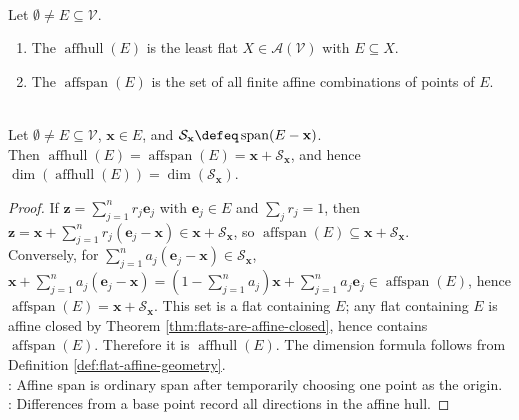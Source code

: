 \begin{definition} \label{def:affine-hull-and-affine-span} \\
Let $\emptyset\neq E\subseteq\mathcal{V}$.
\begin{enumerate}[label=(\roman*)]
\setlength{\itemsep}{0pt}
\item The  $\operatorname{affhull}(E)$ is the least flat $X\in\mathcal{A}(\mathcal{V})$ with $E\subseteq X$.
\item The  $\operatorname{affspan}(E)$ is the set of all finite affine combinations of points of $E$.
\end{enumerate}
\end{definition}

\begin{theorem} \label{thm:affine-hull-span-formula} \\
Let $\emptyset\neq E\subseteq\mathcal{V}$, $\mathbf{x}\in E$, and $\mathcal{S}_{\mathbf{x}}\defeq\operatorname{span}(E-\mathbf{x})$.\\
Then $\operatorname{affhull}(E)=\operatorname{affspan}(E) =\mathbf{x}+\mathcal{S}_{\mathbf{x}}$, and hence $\dim(\operatorname{affhull}(E)) =\dim(\mathcal{S}_{\mathbf{x}})$.
\begin{proof}
If $\mathbf{z}=\sum\limits_{j=1}^n r_j\mathbf{e}_j$ with $\mathbf{e}_j\in E$ and $\sum\limits_j r_j=1$, then $\mathbf{z} =\mathbf{x}+\sum\limits_{j=1}^n r_j(\mathbf{e}_j-\mathbf{x})\in\mathbf{x}+\mathcal{S}_{\mathbf{x}}$, so $\operatorname{affspan}(E)\subseteq\mathbf{x}+\mathcal{S}_{\mathbf{x}}$.\\
Conversely, for $\sum\limits_{j=1}^n a_j(\mathbf{e}_j-\mathbf{x})\in\mathcal{S}_{\mathbf{x}}$, $\mathbf{x}+\sum\limits_{j=1}^n a_j(\mathbf{e}_j-\mathbf{x}) =\left(1-\sum\limits_{j=1}^n a_j\right)\mathbf{x}+\sum_{j=1}^n a_j\mathbf{e}_j\in\operatorname{affspan}(E)$, hence $\operatorname{affspan}(E)=\mathbf{x}+\mathcal{S}_{\mathbf{x}}$. This set is a flat containing $E$; any flat containing $E$ is affine closed by Theorem \ref{thm:flats-are-affine-closed}, hence contains $\operatorname{affspan}(E)$. Therefore it is $\operatorname{affhull}(E)$. The dimension formula follows from Definition \ref{def:flat-affine-geometry}.\\
: Affine span is ordinary span after temporarily choosing one point as the origin.\\
: Differences from a base point record all directions in the affine hull.
\end{proof}
\end{theorem}

